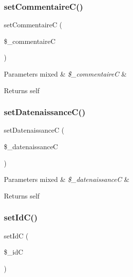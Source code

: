 \subsubsection{\texorpdfstring{set\+Commentaire\+C()}{setCommentaireC()}}
{\footnotesize\ttfamily set\+CommentaireC (\begin{DoxyParamCaption}\item[{}]{\$\+\_\+commentaireC }\end{DoxyParamCaption})}


\begin{DoxyParams}[1]{Parameters}
mixed & {\em \$\+\_\+commentaireC} & \\
\hline
\end{DoxyParams}
\begin{DoxyReturn}{Returns}
self 
\end{DoxyReturn}
\mbox{\label{class_contact_aca45aee44545d278835230e74736f639}} 
\subsubsection{\texorpdfstring{set\+Datenaissance\+C()}{setDatenaissanceC()}}
{\footnotesize\ttfamily set\+DatenaissanceC (\begin{DoxyParamCaption}\item[{}]{\$\+\_\+datenaissanceC }\end{DoxyParamCaption})}


\begin{DoxyParams}[1]{Parameters}
mixed & {\em \$\+\_\+datenaissanceC} & \\
\hline
\end{DoxyParams}
\begin{DoxyReturn}{Returns}
self 
\end{DoxyReturn}
\mbox{\label{class_contact_a84af00fb01af735e355fef9528dfdffe}} 
\subsubsection{\texorpdfstring{set\+Id\+C()}{setIdC()}}
{\footnotesize\ttfamily set\+IdC (\begin{DoxyParamCaption}\item[{}]{\$\+\_\+idC }\end{DoxyParamCaption})}


